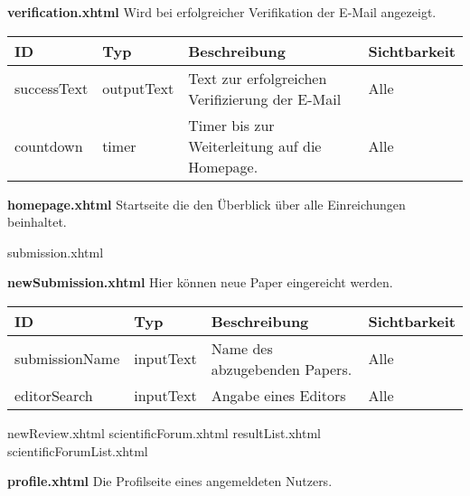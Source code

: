 \textbf{verification.xhtml} Wird bei erfolgreicher Verifikation der E-Mail angezeigt.

\begin{tabular}[H]{|m{2.5cm}|m{3cm}|m{6cm}|m{2.5cm}|}
    \hline
    \textbf{ID} & \textbf{Typ} & \textbf{Beschreibung} & \textbf{Sichtbarkeit} \\
    \hline
    \hline
    successText & outputText & Text zur erfolgreichen Verifizierung der E-Mail & Alle\\
    \hline
    countdown & timer & Timer bis zur Weiterleitung auf die Homepage. & Alle \\
    \hline
\end{tabular}

\textbf{homepage.xhtml} Startseite die den Überblick über alle Einreichungen beinhaltet.

submission.xhtml

\textbf{newSubmission.xhtml} Hier können neue Paper eingereicht werden.

\begin{tabular}[H]{|m{2.5cm}|m{3cm}|m{6cm}|m{2.5cm}|}
    \hline
    \textbf{ID} & \textbf{Typ} & \textbf{Beschreibung} & \textbf{Sichtbarkeit} \\
    \hline
    \hline
    submissionName & inputText & Name des abzugebenden Papers. & Alle\\
    \hline
    editorSearch & inputText & Angabe eines Editors & Alle\\

    \hline
\end{tabular}

newReview.xhtml
scientificForum.xhtml
resultList.xhtml
scientificForumList.xhtml

\textbf{profile.xhtml} Die Profilseite eines angemeldeten Nutzers.

